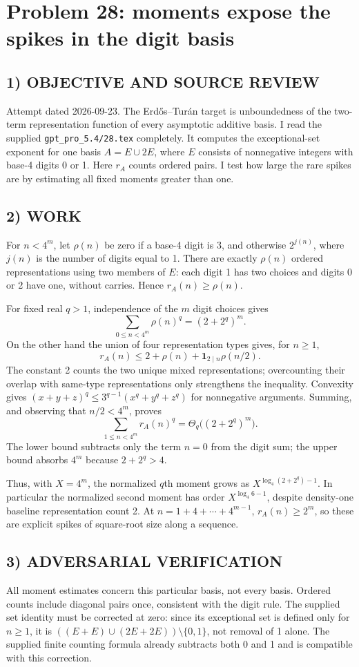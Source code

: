 \section{Problem 28: moments expose the spikes in the digit basis}
\subsection*{1) OBJECTIVE AND SOURCE REVIEW}
Attempt dated 2026-09-23. The Erd\H{o}s--Tur\'an target is unboundedness of the two-term representation function of every asymptotic additive basis. I read the supplied \texttt{gpt\_pro\_5.4/28.tex} completely. It computes the exceptional-set exponent for one basis $A=E\cup2E$, where $E$ consists of nonnegative integers with base-4 digits 0 or 1. Here $r_A$ counts ordered pairs. I test how large the rare spikes are by estimating all fixed moments greater than one.
\subsection*{2) WORK}
For $n<4^m$, let $\rho(n)$ be zero if a base-4 digit is 3, and otherwise $2^{j(n)}$, where $j(n)$ is the number of digits equal to 1. There are exactly $\rho(n)$ ordered representations using two members of $E$: each digit 1 has two choices and digits 0 or 2 have one, without carries. Hence $r_A(n)\ge\rho(n)$.

For fixed real $q>1$, independence of the $m$ digit choices gives
\[
\sum_{0\le n<4^m}\rho(n)^q=(2+2^q)^m.
\]
On the other hand the union of four representation types gives, for $n\ge1$,
\[
r_A(n)\le2+\rho(n)+\mathbf1_{2\mid n}\rho(n/2).
\]
The constant 2 counts the two unique mixed representations; overcounting their overlap with same-type representations only strengthens the inequality. Convexity gives $(x+y+z)^q\le3^{q-1}(x^q+y^q+z^q)$ for nonnegative arguments. Summing, and observing that $n/2<4^m$, proves
\[
\sum_{1\le n<4^m}r_A(n)^q
=\Theta_q\bigl((2+2^q)^m\bigr).
\]
The lower bound subtracts only the term $n=0$ from the digit sum; the upper bound absorbs $4^m$ because $2+2^q>4$.

Thus, with $X=4^m$, the normalized $q$th moment grows as
$X^{\log_4(2+2^q)-1}$. In particular the normalized second moment has order $X^{\log_4 6-1}$, despite density-one baseline representation count 2. At $n=1+4+\cdots+4^{m-1}$, $r_A(n)\ge2^m$, so these are explicit spikes of square-root size along a sequence.
\subsection*{3) ADVERSARIAL VERIFICATION}
All moment estimates concern this particular basis, not every basis. Ordered counts include diagonal pairs once, consistent with the digit rule. The supplied set identity must be corrected at zero: since its exceptional set is defined only for $n\ge1$, it is $((E+E)\cup(2E+2E))\setminus\{0,1\}$, not removal of 1 alone. The supplied finite counting formula already subtracts both 0 and 1 and is compatible with this correction.
